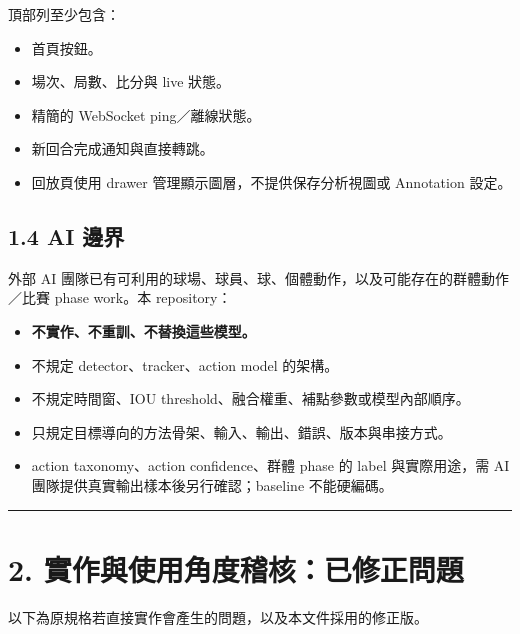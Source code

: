 \documentclass[
  9pt,
  a4paper,
]{article}
\providecommand{\tightlist}{%
  \setlength{\itemsep}{0pt}\setlength{\parskip}{0pt}}
\begin{document}
頂部列至少包含：

\begin{itemize}
\tightlist
\item
  首頁按鈕。
\item
  場次、局數、比分與 live 狀態。
\item
  精簡的 WebSocket ping／離線狀態。
\item
  新回合完成通知與直接轉跳。
\item
  回放頁使用 drawer 管理顯示圖層，不提供保存分析視圖或 Annotation 設定。
\end{itemize}

\subsection{1.4 AI 邊界}\label{14-ai-ux908aux754c}

外部 AI
團隊已有可利用的球場、球員、球、個體動作，以及可能存在的群體動作／比賽
phase work。本 repository：

\begin{itemize}
\tightlist
\item
  \textbf{不實作、不重訓、不替換這些模型。}
\item
  不規定 detector、tracker、action model 的架構。
\item
  不規定時間窗、IOU threshold、融合權重、補點參數或模型內部順序。
\item
  只規定目標導向的方法骨架、輸入、輸出、錯誤、版本與串接方式。
\item
  action taxonomy、action confidence、群體 phase 的 label 與實際用途，需
  AI 團隊提供真實輸出樣本後另行確認；baseline 不能硬編碼。
\end{itemize}

\begin{center}\rule{0.5\linewidth}{0.5pt}\end{center}

\section{2.
實作與使用角度稽核：已修正問題}\label{2-ux5be6ux4f5cux8207ux4f7fux7528ux89d2ux5ea6ux7a3dux6838ux5df2ux4feeux6b63ux554fux984c}

以下為原規格若直接實作會產生的問題，以及本文件採用的修正版。
\end{document}
